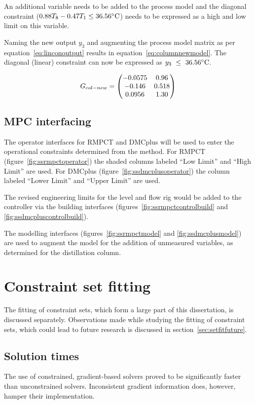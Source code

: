 An additional variable needs to be added to the process model and the diagonal constraint ($0.88T_8-0.47T_1\leq 36.56^{\circ}\text{{C}} $) needs to be expressed as a high and low limit on this variable.

Naming the new output $y_3$ and augmenting the process model matrix as per equation~\ref{eq:linconoutput} results in equation~\ref{eq:columnnewmodel}.
The diagonal (linear) constraint can now be expressed as {$y_3~\leq~36.56^{\circ}\text{{C}}$}.

\begin{equation}
  \label{eq:columnnewmodel}
  G_{col-new}= \bpm -0.0575 & 0.96 \\       %
                  -0.146  & 0.518 \\      %
                   0.0956 & 1.30 \\ \epm  %
\end{equation}

\subsection{MPC interfacing}
The operator interfaces for RMPCT and DMCplus will be used to enter the operational constraints determined from the method.
For RMPCT (figure~\ref{fig:ssrmpctoperator}) the shaded columns labeled ``Low Limit'' and ``High Limit'' are used.
For DMCplus (figure~\ref{fig:ssdmcplusoperator}) the column labeled ``Lower Limit'' and ``Upper Limit'' are used.

The revised engineering limits for the level and flow rig would be added to the controller via the building interfaces (figures~\ref{fig:ssrmpctcontrolbuild} and \ref{fig:ssdmcpluscontrolbuild}).

The modelling interfaces (figures~\ref{fig:ssrmpctmodel} and \ref{fig:ssdmcplusmodel}) are used to augment the model for the addition of unmeasured variables, as determined for the distillation column.

\section{Constraint set fitting}
The fitting of constraint sets, which form a large part of this dissertation, is discussed separately.
Observations made while studying the fitting of constraint sets, which could lead to future research is discussed in section~\ref{sec:setfitfuture}.

\subsection{Solution times}
The use of constrained, gradient-based solvers proved to be significantly faster than unconstrained solvers.
Inconsistent gradient information does, however, hamper their implementation.

